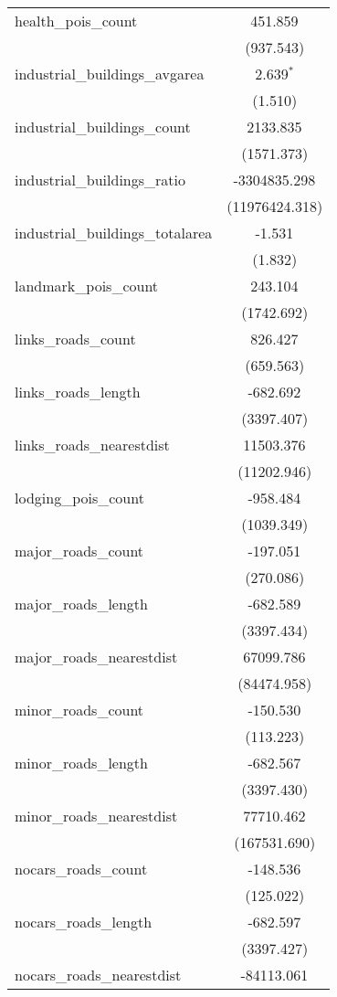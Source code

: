 \begin{table}[!htbp]
\begin{tabular}{@{\extracolsep{5pt}}lc}
 health_pois_count & 451.859$^{}$ \\
  & (937.543) \\
 industrial_buildings_avgarea & 2.639$^{*}$ \\
  & (1.510) \\
 industrial_buildings_count & 2133.835$^{}$ \\
  & (1571.373) \\
 industrial_buildings_ratio & -3304835.298$^{}$ \\
  & (11976424.318) \\
 industrial_buildings_totalarea & -1.531$^{}$ \\
  & (1.832) \\
 landmark_pois_count & 243.104$^{}$ \\
  & (1742.692) \\
 links_roads_count & 826.427$^{}$ \\
  & (659.563) \\
 links_roads_length & -682.692$^{}$ \\
  & (3397.407) \\
 links_roads_nearestdist & 11503.376$^{}$ \\
  & (11202.946) \\
 lodging_pois_count & -958.484$^{}$ \\
  & (1039.349) \\
 major_roads_count & -197.051$^{}$ \\
  & (270.086) \\
 major_roads_length & -682.589$^{}$ \\
  & (3397.434) \\
 major_roads_nearestdist & 67099.786$^{}$ \\
  & (84474.958) \\
 minor_roads_count & -150.530$^{}$ \\
  & (113.223) \\
 minor_roads_length & -682.567$^{}$ \\
  & (3397.430) \\
 minor_roads_nearestdist & 77710.462$^{}$ \\
  & (167531.690) \\
 nocars_roads_count & -148.536$^{}$ \\
  & (125.022) \\
 nocars_roads_length & -682.597$^{}$ \\
  & (3397.427) \\
 nocars_roads_nearestdist & -84113.061$^{}$ \\

\end{tabular}
\end{table}
